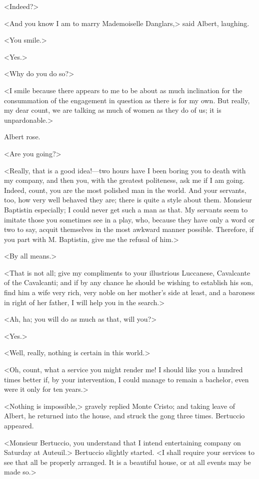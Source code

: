  <Indeed?>

<And you know I am to marry Mademoiselle Danglars,> said Albert, laughing. 

 <You smile.> 

 <Yes.> 

 <Why do you do so?> 

 <I smile because there appears to me to be about as much inclination for the consummation of the engagement in question as there is for my own. But really, my dear count, we are talking as much of women as they do of us; it is unpardonable.> 

 Albert rose. 

 <Are you going?> 

 <Really, that is a good idea!—two hours have I been boring you to death with my company, and then you, with the greatest politeness, ask me if I am going. Indeed, count, you are the most polished man in the world. And your servants, too, how very well behaved they are; there is quite a style about them. Monsieur Baptistin especially; I could never get such a man as that. My servants seem to imitate those you sometimes see in a play, who, because they have only a word or two to say, acquit themselves in the most awkward manner possible. Therefore, if you part with M. Baptistin, give me the refusal of him.> 

 <By all means.> 

 <That is not all; give my compliments to your illustrious Luccanese, Cavalcante of the Cavalcanti; and if by any chance he should be wishing to establish his son, find him a wife very rich, very noble on her mother's side at least, and a baroness in right of her father, I will help you in the search.> 

 <Ah, ha; you will do as much as that, will you?> 

 <Yes.> 

 <Well, really, nothing is certain in this world.> 

 <Oh, count, what a service you might render me! I should like you a hundred times better if, by your intervention, I could manage to remain a bachelor, even were it only for ten years.> 

 <Nothing is impossible,> gravely replied Monte Cristo; and taking leave of Albert, he returned into the house, and struck the gong three times. Bertuccio appeared. 

 <Monsieur Bertuccio, you understand that I intend entertaining company on Saturday at Auteuil.> Bertuccio slightly started. <I shall require your services to see that all be properly arranged. It is a beautiful house, or at all events may be made so.> 

